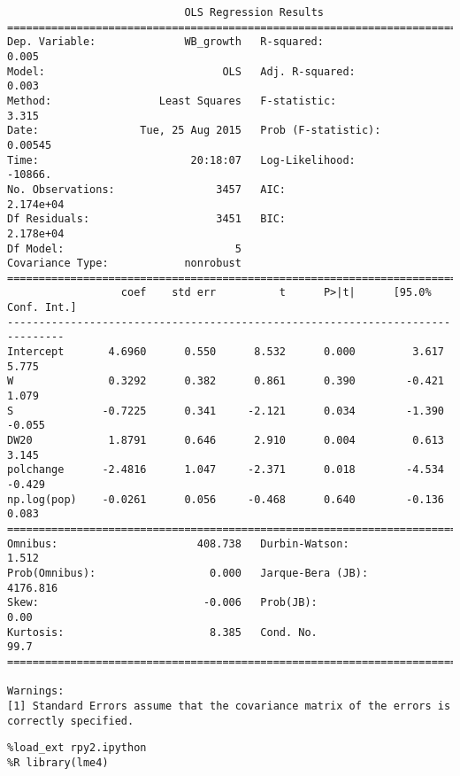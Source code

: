 \documentclass[12pt,fleqn]{article}\usepackage{common}
\begin{document}
\begin{verbatim}
                            OLS Regression Results                            
==============================================================================
Dep. Variable:              WB_growth   R-squared:                       0.005
Model:                            OLS   Adj. R-squared:                  0.003
Method:                 Least Squares   F-statistic:                     3.315
Date:                Tue, 25 Aug 2015   Prob (F-statistic):            0.00545
Time:                        20:18:07   Log-Likelihood:                -10866.
No. Observations:                3457   AIC:                         2.174e+04
Df Residuals:                    3451   BIC:                         2.178e+04
Df Model:                           5                                         
Covariance Type:            nonrobust                                         
===============================================================================
                  coef    std err          t      P>|t|      [95.0% Conf. Int.]
-------------------------------------------------------------------------------
Intercept       4.6960      0.550      8.532      0.000         3.617     5.775
W               0.3292      0.382      0.861      0.390        -0.421     1.079
S              -0.7225      0.341     -2.121      0.034        -1.390    -0.055
DW20            1.8791      0.646      2.910      0.004         0.613     3.145
polchange      -2.4816      1.047     -2.371      0.018        -4.534    -0.429
np.log(pop)    -0.0261      0.056     -0.468      0.640        -0.136     0.083
==============================================================================
Omnibus:                      408.738   Durbin-Watson:                   1.512
Prob(Omnibus):                  0.000   Jarque-Bera (JB):             4176.816
Skew:                          -0.006   Prob(JB):                         0.00
Kurtosis:                       8.385   Cond. No.                         99.7
==============================================================================

Warnings:
[1] Standard Errors assume that the covariance matrix of the errors is correctly specified.
\end{verbatim}


\begin{verbatim}
%load_ext rpy2.ipython
%R library(lme4)
\end{verbatim}
\end{document}
